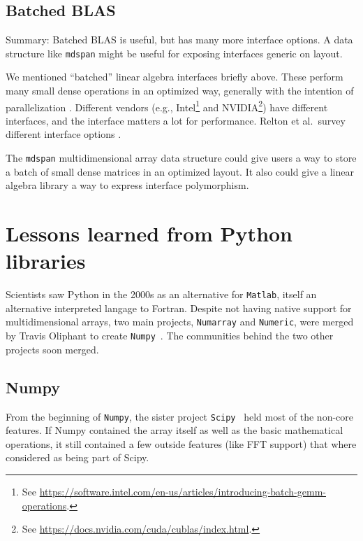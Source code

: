 \subsection{Batched BLAS}
\label{SS:other-standards:batched}

Summary: Batched BLAS is useful, but has many more interface options.
A data structure like \texttt{mdspan} \cite{P0009r8} might be useful
for exposing interfaces generic on layout.

We mentioned ``batched'' linear algebra interfaces briefly above.
These perform many small dense operations in an optimized way,
generally with the intention of parallelization
\cite{dongarra2016batched}.  Different vendors (e.g.,
Intel\footnote{See
  \url{https://software.intel.com/en-us/articles/introducing-batch-gemm-operations}.}
and NVIDIA\footnote{See
  \url{https://docs.nvidia.com/cuda/cublas/index.html}.}) have
different interfaces, and the interface matters a lot for performance.
Relton et al.\ survey different interface options
\cite{relton2016comparison}.

The \texttt{mdspan} \cite{P0009r8} multidimensional array data
structure could give users a way to store a batch of small dense
matrices in an optimized layout.  It also could give a linear algebra
library a way to express interface polymorphism.

\section{Lessons learned from Python libraries}
\label{S:Python}

Scientists saw Python in the 2000s as an alternative for \texttt{Matlab}, itself
 an alternative interpreted langage to Fortran. Despite not having native
  support for multidimensional arrays, two main projects, \texttt{Numarray} and
  \texttt{Numeric}, were merged by Travis Oliphant to create
  \texttt{Numpy}~\cite{oliphant2006numpy}. The communities behind
  the two other projects soon merged.

\subsection{Numpy}
\label{S:Python:numpy}

From the beginning of \texttt{Numpy}, the sister project
 \texttt{Scipy}~\cite{scipy2001} held most of the non-core features.
 If Numpy contained the array itself as well as the basic mathematical
 operations, it still contained a few outside features (like FFT
 support) that where considered as being part of Scipy.

